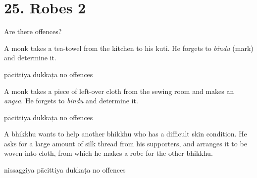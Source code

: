 \chapter{25. Robes 2}
\renewcommand*{\theChapterTitle}{25. Robes 2}

\begin{exam}{\autoExamName}

  \begin{problem*}

    Are there offences?

    \begin{parts}

      \item A monk takes a tea-towel from the kitchen to his kuti.
      He forgets to \emph{bindu} (mark) and determine it.

      \bigskip

      \begin{answers}{3}
        \bChoices
         pācittiya\eAns
         dukkaṭa\eAns
         no offences\eAns
        \eChoices
      \end{answers}

      \bigskip

      \item A monk takes a piece of left-over cloth from the sewing room and
      makes an \emph{angsa}. He forgets to \emph{bindu} and determine it.

      \bigskip

      \begin{answers}{3}
        \bChoices
         pācittiya\eAns
         dukkaṭa\eAns
         no offences\eAns
        \eChoices
      \end{answers}

      \bigskip

      \item A bhikkhu wants to help another bhikkhu who has a difficult skin
      condition. He asks for a large amount of silk thread from his supporters,
      and arranges it to be woven into cloth, from which he makes a robe for the
      other bhikkhu.

      \bigskip

      \begin{answers}{3}
        \bChoices
         nissaggiya pācittiya\eAns
         dukkaṭa\eAns
         no offences\eAns
        \eChoices
      \end{answers}

      \bigskip


\end{parts}
\end{problem*}
\end{exam}
